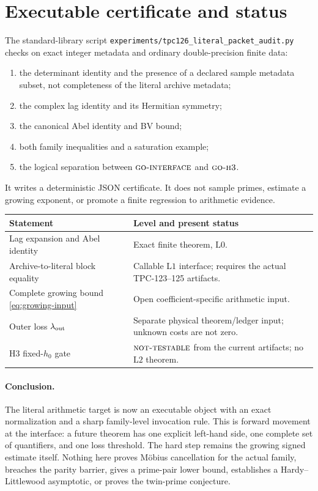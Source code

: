 \documentclass[11pt]{article}
\theoremstyle{definition}
\theoremstyle{remark}
\newcommand{\Lzero}{\mathrm{L0}}
\newcommand{\Lone}{\mathrm{L1}}
\newcommand{\Ltwo}{\mathrm{L2}}
\newcommand{\GOI}{\textsc{go-interface}}
\newcommand{\GOH}{\textsc{go-h3}}
\newcommand{\NT}{\textsc{not-testable}}
\begin{document}
\section{Executable certificate and status}

The standard-library script
\texttt{experiments/tpc126\_literal\_packet\_audit.py} checks on exact
integer metadata and ordinary double-precision finite data:
\begin{enumerate}[leftmargin=2em]
\item the determinant identity and the presence of a declared sample
  metadata subset, not completeness of the literal archive metadata;
\item the complex lag identity and its Hermitian symmetry;
\item the canonical Abel identity and BV bound;
\item both family inequalities and a saturation example;
\item the logical separation between \(\GOI\) and \(\GOH\).
\end{enumerate}
It writes a deterministic JSON certificate.  It does not sample
primes, estimate a growing exponent, or promote a finite regression
to arithmetic evidence.

\begin{center}
\small
\begin{tabularx}{\textwidth}{@{}p{}X@{}}
\toprule
Statement & Level and present status\\
\midrule
Lag expansion and Abel identity
& Exact finite theorem, \(\Lzero\).\\
Archive-to-literal block equality
& Callable \(\Lone\) interface; requires the actual TPC-123--125
artifacts.\\
Complete growing bound \eqref{eq:growing-input}
& Open coefficient-specific arithmetic input.\\
Outer loss \(\lambda_{\rm out}\)
& Separate physical theorem/ledger input; unknown costs are not zero.\\
H3 fixed-\(h_0\) gate
& \(\NT\) from the current artifacts; no \(\Ltwo\) theorem.\\
\bottomrule
\end{tabularx}
\end{center}

\paragraph{Conclusion.}
The literal arithmetic target is now an executable object with an
exact normalization and a sharp family-level invocation rule.  This
is forward movement at the interface: a future theorem has one
explicit left-hand side, one complete set of quantifiers, and one
loss threshold.  The hard step remains the growing signed estimate
itself.  Nothing here proves M\"obius cancellation for the actual
family, breaches the parity barrier, gives a prime-pair lower bound,
establishes a Hardy--Littlewood asymptotic, or proves the twin-prime
conjecture.

\begingroup
\small
\setlength{\bibsep}{2pt plus 0.3ex}
\sloppy


\endgroup
\end{document}
